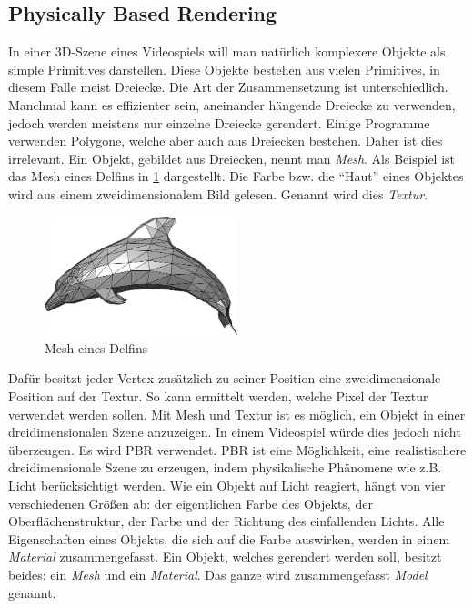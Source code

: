 \subsection{Physically Based Rendering}

In einer 3D-Szene eines Videospiels will man natürlich komplexere Objekte als simple Primitives darstellen. Diese Objekte bestehen aus vielen Primitives, in diesem Falle meist Dreiecke. 
Die Art der Zusammensetzung ist unterschiedlich. Manchmal kann es effizienter sein, aneinander hängende Dreiecke zu verwenden, jedoch werden meistens nur einzelne Dreiecke gerendert. 
Einige Programme verwenden %
Polygone, welche aber auch aus Dreiecken bestehen. Daher ist dies irrelevant. 
Ein Objekt, gebildet aus Dreiecken, nennt man \textit{Mesh}. Als Beispiel ist das Mesh eines Delfins in \cref{Dolphin} dargestellt. Die Farbe bzw. die "`Haut"' eines Objektes wird aus einem zweidimensionalem Bild gelesen. Genannt wird dies \textit{Textur}.

\begin{figure}
	\begin{center}
		\includegraphics[width=0.5\textwidth]{06anhang/bilder/delphin.jpg}
		\caption{Mesh eines Delfins}
		\label{Dolphin}
	\end{center}
\end{figure}
 
Dafür besitzt jeder Vertex zusätzlich zu seiner Position eine zweidimensionale Position auf der Textur. So kann ermittelt werden, welche Pixel der Textur verwendet werden sollen.
Mit Mesh und Textur ist es möglich, ein Objekt in einer dreidimensionalen Szene anzuzeigen. In einem Videospiel würde dies jedoch nicht überzeugen. Es wird \ac{PBR} verwendet. \ac{PBR} ist eine Möglichkeit, eine realistischere dreidimensionale Szene zu erzeugen, indem physikalische Phänomene wie z.B. Licht berücksichtigt werden. 
Wie ein Objekt auf Licht reagiert, hängt von vier verschiedenen Größen ab: der eigentlichen Farbe des Objekts, der Oberflächenstruktur, der Farbe und der Richtung des einfallenden Lichts. Alle Eigenschaften eines Objekts, die sich auf die Farbe auswirken, werden in einem \textit{Material} zusammengefasst. 
Ein Objekt, welches gerendert werden soll, besitzt beides: 
ein \textit{Mesh} und ein \textit{Material}. Das ganze wird zusammengefasst \textit{Model} genannt.

